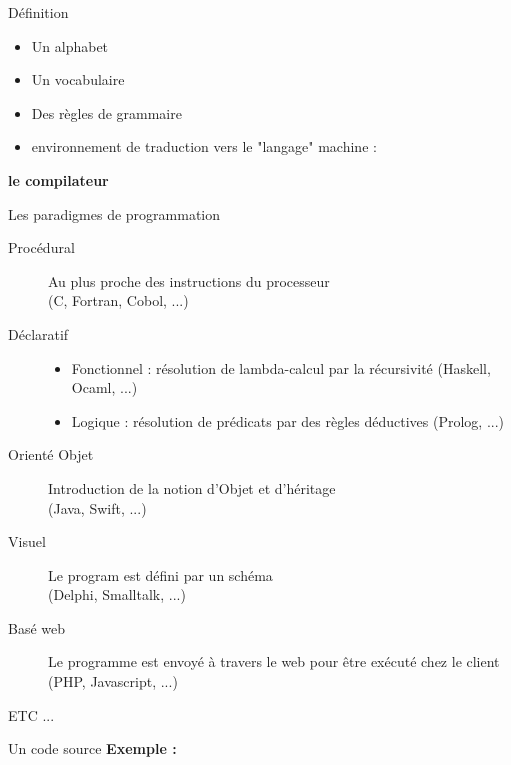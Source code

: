 \begin{frame}{Définition}
    \begin{itemize}
        \item Un alphabet
        \item Un vocabulaire
        \item Des règles de grammaire
        \item environnement de traduction vers le "langage" machine : 
    \end{itemize}
    \begin{center}
        \textbf{le compilateur}
    \end{center}
\end{frame}

\begin{frame}{Les paradigmes de programmation}
    \begin{description}
        \item [Procédural] Au plus proche des instructions du processeur 
                        \\(C, Fortran, Cobol, ...)
        \item [Déclaratif]
        \begin{itemize}
            \item Fonctionnel : résolution de lambda-calcul par la récursivité (Haskell, Ocaml, ...)
            \item Logique : résolution de prédicats par des règles déductives (Prolog, ...)
        \end{itemize}
        \item [Orienté Objet] Introduction de la notion d'Objet et d'héritage 
                            \\(Java, Swift, ...)
        \item [Visuel] Le program est défini par un schéma 
                    \\(Delphi, Smalltalk, ...)
        \item [Basé web] Le programme est envoyé à travers le web pour être exécuté chez le client (PHP, Javascript, ...)
        \item [ETC ...]
    \end{description}
\end{frame}

\begin{frame}{Un code source}
    \textbf{Exemple :}
\end{frame}


